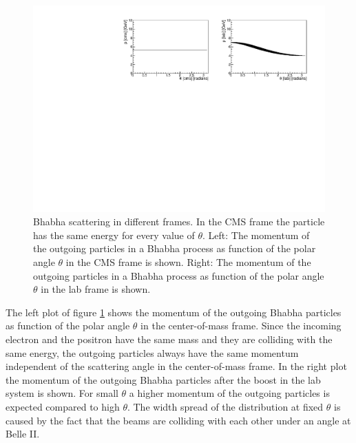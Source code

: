 \documentclass[a4paper,11pt,twosided,final,german,openbib,pdftex,listof=totoc,bibliography=totoc]{scrbook}
\begin{document}
\begin{figure}[h!]
	\centering
	\includegraphics[width=\textwidth]{Bilder/CThetaP}
	\caption[Momentum As Function Of $\theta$ In The CMS And LAB Frame]{Bhabha scattering in different frames. In the CMS frame the particle has the same energy for every value of $\theta$. Left: The momentum of the outgoing particles in a Bhabha process as function of the polar angle $\theta$ in the CMS frame is shown. Right: The momentum of the outgoing particles in a Bhabha process as function of the polar angle $\theta$ in the lab frame is shown.}
	\label{fig:Belle IIMomentum}
	
\end{figure}

The left plot of figure \ref{fig:Belle IIMomentum} shows the momentum of the outgoing Bhabha particles as function of the polar angle $\theta$ in the center-of-mass frame. Since the incoming electron and the positron have the same mass and they are colliding with the same energy, the outgoing particles always have the same momentum independent of the scattering angle in the center-of-mass frame. In the right plot the momentum of the outgoing Bhabha particles after the boost in the lab system is shown. For small $\theta$ a higher momentum of the outgoing particles is expected compared to high $\theta$. The width spread of the distribution at fixed $\theta$ is caused by the fact that the beams are colliding with each other under an angle at Belle II.
\end{document}
